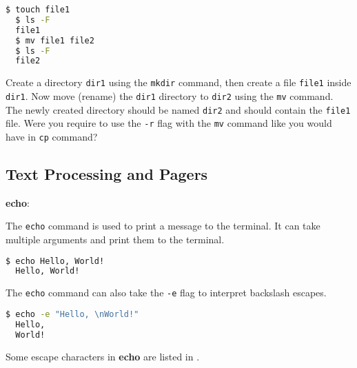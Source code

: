 \begin{lstlisting}[language=bash]
  $ touch file1
  $ ls -F
  file1
  $ mv file1 file2
  $ ls -F
  file2
\end{lstlisting}

\begin{exercise}
  Create a directory \lstinline|dir1| using the \lstinline|mkdir| command, then create a file \lstinline|file1| inside \lstinline|dir1|.
  Now move (rename) the \lstinline|dir1| directory to \lstinline|dir2| using the \lstinline|mv| command.
  The newly created directory should be named \lstinline|dir2| and should contain the \lstinline|file1| file.
  Were you require to use the \lstinline|-r| flag with the \lstinline|mv| command like you would have in \lstinline|cp| command?
\end{exercise}

\subsection{Text Processing and Pagers}

\textbf{echo}:

The \lstinline|echo| command is used to print a message to the terminal.
It can take multiple arguments and print them to the terminal.

\begin{lstlisting}[language=bash]
  $ echo Hello, World!
  Hello, World!
\end{lstlisting}

The \lstinline|echo| command can also take the \lstinline|-e| flag to interpret backslash escapes.

\begin{lstlisting}[language=bash]
  $ echo -e "Hello, \nWorld!"
  Hello,
  World!
\end{lstlisting}

Some escape characters in \textbf{echo} are listed in .

